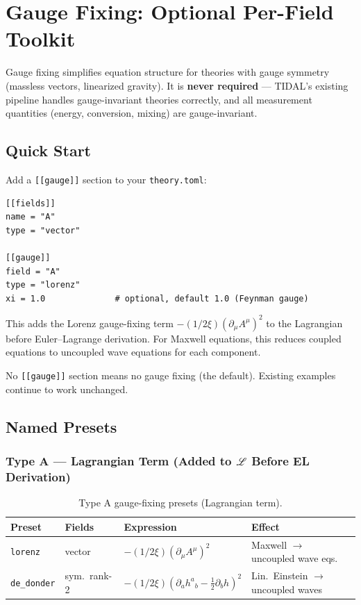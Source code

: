 
\section{Gauge Fixing: Optional Per-Field Toolkit}
\label{sec:gauge-fixing}

Gauge fixing simplifies equation structure for theories with gauge symmetry
(massless vectors, linearized gravity). It is \textbf{never required} --- TIDAL's
existing pipeline handles gauge-invariant theories correctly, and all
measurement quantities (energy, conversion, mixing) are gauge-invariant.

\subsection{Quick Start}
\label{sec:gauge-quick-start}

Add a \texttt{[[gauge]]} section to your \texttt{theory.toml}:

\begin{lstlisting}[style=toml]
[[fields]]
name = "A"
type = "vector"

[[gauge]]
field = "A"
type = "lorenz"
xi = 1.0              # optional, default 1.0 (Feynman gauge)
\end{lstlisting}

This adds the Lorenz gauge-fixing term $-(1/2\xi)(\partial_\mu A^\mu)^2$ to the
Lagrangian before Euler--Lagrange derivation. For Maxwell equations, this
reduces coupled equations to uncoupled wave equations for each component.

No \texttt{[[gauge]]} section means no gauge fixing (the default). Existing
examples continue to work unchanged.

\subsection{Named Presets}
\label{sec:gauge-presets}

\subsubsection{Type A --- Lagrangian Term (Added to $\mathscr{L}$ Before EL Derivation)}
\label{sec:gauge-type-a}

\begin{table}[htbp]
\centering
\caption{Type A gauge-fixing presets (Lagrangian term).}
\label{tab:gauge-type-a}
\begin{tabular}{@{}llll@{}}
\toprule
Preset & Fields & Expression & Effect \\
\midrule
\texttt{lorenz} & vector & $-(1/2\xi)(\partial_\mu A^\mu)^2$ & Maxwell $\to$ uncoupled wave eqs. \\
\texttt{de\_donder} & sym.\ rank-2 & $-(1/2\xi)(\partial_a h^a{}_b - \tfrac{1}{2}\partial_b h)^2$ & Lin.\ Einstein $\to$ uncoupled waves \\
\bottomrule
\end{tabular}
\end{table}

